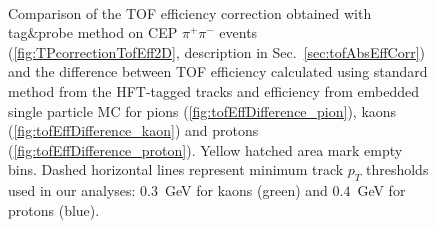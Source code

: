 \begin{figure}[b!]\vspace{-34pt}
\centering
\parbox{0.31\textwidth}{
  \centering
  \begin{subfigure}[b]{\linewidth}{
                }
  \end{subfigure} 
} 
\quad
\parbox{0.65\textwidth}{ 
  \centering
		\begin{minipage}[t][0.64\linewidth][t]{\linewidth}\vspace{73pt}
			\caption[Comparison of the TOF eff. correction from tag\&probe method and the difference between TOF eff. calculated using standard method from the HFT-tagged tracks and efficiency from embedded single particle MC.]%
    {Comparison of the TOF efficiency correction obtained with tag\&probe method on CEP $\pi^{+}\pi^{-}$ events (\ref{fig:TPcorrectionTofEff2D}, description in Sec.~\ref{sec:tofAbsEffCorr}) and the difference between TOF efficiency calculated using standard method from the HFT-tagged tracks and efficiency from embedded single particle MC for pions (\ref{fig:tofEffDifference_pion}), kaons (\ref{fig:tofEffDifference_kaon}) and protons (\ref{fig:tofEffDifference_proton}). Yellow hatched area mark empty bins. Dashed horizontal lines represent minimum track $p_{T}$ thresholds used in our analyses: $0.3$~GeV for kaons (green) and $0.4$~GeV for protons (blue).}\label{fig:tofEffSystematics2DComparison}%
		\end{minipage}
}\\[-25pt]

\end{figure}
